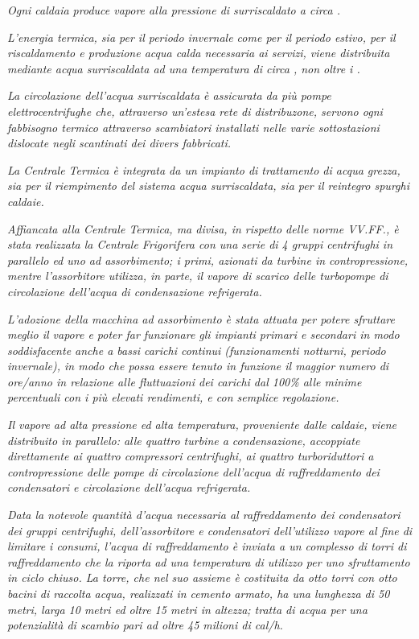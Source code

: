 \begin{quoting}
	\emph{Ogni caldaia produce vapore alla pressione di  surriscaldato a circa .}
	
	\emph{L'energia termica, sia per il periodo invernale come per il periodo estivo, per il riscaldamento e produzione acqua calda necessaria ai servizi, viene distribuita mediante acqua surriscaldata ad una temperatura di circa , non oltre i .}
	
	\sdots
	
	\emph{La circolazione dell'acqua surriscaldata è assicurata da più pompe elettrocentrifughe che, attraverso un'estesa rete di distribuzone, servono ogni fabbisogno termico attraverso scambiatori installati nelle varie sottostazioni dislocate negli scantinati dei divers fabbricati.}
	
	\emph{La Centrale Termica è integrata da un impianto di trattamento di acqua grezza, sia per il riempimento del sistema acqua surriscaldata, sia per il reintegro spurghi caldaie.}
	
	\emph{Affiancata alla Centrale Termica, ma divisa, in rispetto delle norme VV.FF., è stata realizzata la Centrale Frigorifera con una serie di 4 gruppi centrifughi in parallelo ed uno ad assorbimento; i primi, azionati da turbine in contropressione, mentre l'assorbitore utilizza, in parte, il vapore di scarico delle turbopompe di circolazione dell'acqua di condensazione refrigerata.}
	
	\emph{L'adozione della macchina ad assorbimento è stata attuata per potere sfruttare meglio il vapore e poter far funzionare gli impianti primari e secondari in modo soddisfacente anche a bassi carichi continui (funzionamenti notturni, periodo invernale), in modo che possa essere tenuto in funzione il maggior numero di ore/anno in relazione alle fluttuazioni dei carichi dal 100\% alle minime percentuali con i più elevati rendimenti, e con semplice regolazione.}
	
	\emph{Il vapore ad alta pressione ed alta temperatura, proveniente dalle caldaie, viene distribuito in parallelo: alle quattro turbine a condensazione, accoppiate direttamente ai quattro compressori centrifughi, ai quattro turboriduttori a contropressione delle pompe di circolazione dell'acqua di raffreddamento dei condensatori e circolazione dell'acqua refrigerata.}
	
	\sdots
	
	\emph{Data la notevole quantità d'acqua necessaria al raffreddamento dei condensatori dei gruppi centrifughi, dell'assorbitore e condensatori dell'utilizzo vapore al fine di limitare i consumi, l'acqua di raffreddamento è inviata a un complesso di torri di raffreddamento che la riporta ad una temperatura di utilizzo per uno sfruttamento in ciclo chiuso. La torre, che nel suo assieme è costituita da otto torri con otto bacini di raccolta acqua, realizzati in cemento armato, ha una lunghezza di 50 metri, larga 10 metri ed oltre 15 metri in altezza; tratta  di acqua per una potenzialità di scambio pari ad oltre 45 milioni di \si{cal/h}.}
\end{quoting}
